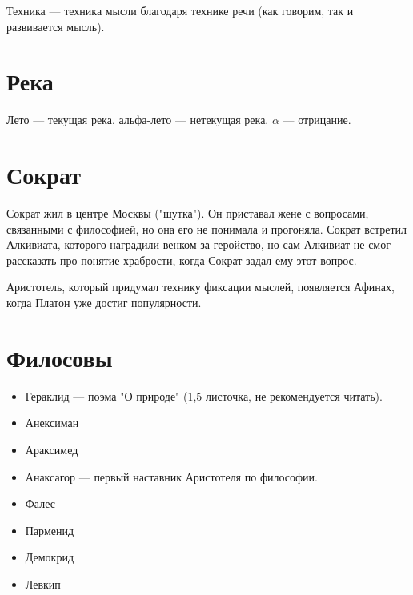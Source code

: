 \documentclass{article}
\begin{document}
Техника --- техника мысли благодаря технике речи (как говорим, так и развивается мысль).



\section{Река}
Лето --- текущая река, альфа-лето --- нетекущая река. $\alpha$ --- отрицание.



\section{Сократ}
Сократ жил в центре Москвы ("шутка"). 
Он приставал жене с вопросами, связанными с философией, но она его не понимала и прогоняла.
Сократ встретил Алкивиата, которого наградили венком за геройство, но сам Алкивиат не смог рассказать 
про понятие храбрости, когда Сократ задал ему этот вопрос.

Аристотель, который придумал технику фиксации мыслей, появляется Афинах, когда Платон уже достиг популярности.



\section{Филосовы}
\begin{itemize}
    \item Гераклид --- поэма "О природе" (1,5 листочка, не рекомендуется читать).
    \item Анексиман
    \item Араксимед
    \item Анаксагор --- первый наставник Аристотеля по философии.
    \item Фалес
    \item Парменид
    \item Демокрид
    \item Левкип
\end{itemize}
\end{document}
